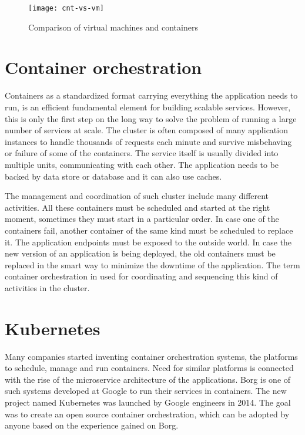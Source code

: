 \documentclass[
  digital, %
  twoside, %
  table,   %
  nolof,   %
  nolot,   %
]{fithesis3}
\begin{document}
\begin{figure}[H]
\caption{Comparison of virtual machines and containers}
\centering
\texttt{[image: cnt-vs-vm]}
\label{fig:cnt-vs-vm}
\end{figure}

\section{Container orchestration} \label{sec:orchestration}
Containers as a standardized format carrying everything the application needs to run, is an efficient fundamental element for building scalable services. However, this is only the first step on the long way to solve the problem of running a large number of services at scale. The cluster is often composed of many application instances to handle thousands of requests each minute and survive misbehaving or failure of some of the containers. The service itself is usually divided into multiple units, communicating with each other. The application needs to be backed by data store or database and it can also use caches.

The management and coordination of such cluster include many different activities. All these containers must be scheduled and started at the right moment, sometimes they must start in a particular order. In case one of the containers fail, another container of the same kind must be scheduled to replace it. The application endpoints must be exposed to the outside world. In case the new version of an application is being deployed, the old containers must be replaced in the smart way to minimize the downtime of the application. The term container orchestration in used for coordinating and sequencing this kind of activities in the cluster.

\section{Kubernetes} \label{sec:k8s}
Many companies started inventing container orchestration systems, the platforms to schedule, manage and run containers. Need for similar platforms is connected with the rise of the microservice architecture of the applications. Borg \cite{borg} is one of such systems developed at Google to run their services in containers. The new project named Kubernetes was launched by Google engineers in 2014. The goal was to create an open source container orchestration, which can be adopted by anyone based on the experience gained on Borg.
\end{document}
